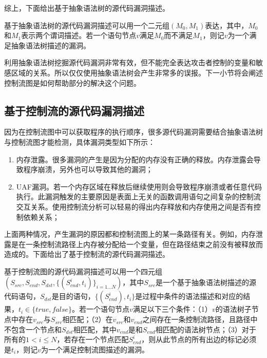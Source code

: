 综上，下面给出基于抽象语法树的源代码漏洞描述。

\begin{definition}
\label{基于抽象语法树的源代码漏洞描述}
基于抽象语法树的源代码漏洞描述可以用一个二元组$(M_0,M_1)$表达，其中，$M_0$和$M_1$表示两个谓词描述。若一个语句节点$v$满足$M_0$而不满足$M_1$，则记$v$为一个满足抽象语法树描述的漏洞。
\end{definition}

利用抽象语法树挖掘源代码漏洞非常有效，但不能完全表达攻击者控制的变量和敏感区域的关系。所以仅仅使用抽象语法树会产生非常多的误报。下一小节将会阐述控制流图是如何帮助部分的解决这个问题。

\subsection{基于控制流的源代码漏洞描述}

因为在控制流图中可以获取程序的执行顺序，很多源代码漏洞需要结合抽象语法树与控制流图才能检测，具体漏洞类型如下所示：

\begin{enumerate}[(1)]
\item 内存泄露。很多漏洞的产生是因为分配的内存没有正确的释放。内存泄露会导致程序崩溃，另外也可以导致其他的漏洞；
\item UAF漏洞。若一个内存区域在释放后继续使用则会导致程序崩溃或者任意代码执行。此漏洞触发的主要原因是表面上无关的函数调用语句之间复杂的控制流交互关系。使用控制流分析可以轻易的得出内存释放和内存使用之间是否有控制依赖关系；
\end{enumerate}
上面两种情况，产生漏洞的原因都和控制流图上的某一条路径有关。例如，内存泄露是在一条控制流路径上内存被分配给一个变量，但在路径结束之前没有被释放而造成的。下面给出了基于控制流的源代码漏洞描述。

\begin{definition}
基于控制流图的源代码漏洞描述可以用一个四元组$(S_{src},S_{end},S_{dst},\{(S^{i}_{cnd},t_i)\}_{i=1...N})$，其中$S_{src}$是一个基于抽象语法树描述的源代码语句，$S_{dst}$是目的语句，$\{(S^{i}_{cnd}),t_i\}$是过程中条件的语法描述和对应的结果，$t_i \in \{true, false\}$。若一个语句节点$v$满足以下三个条件：（1）$v$的语法树子节点中存在$v_{src}$与$S_{src}$相匹配；（2）在$v_{src}$和$v_{end}$之间存在一条控制流路径，且路径中不包含一个节点和$S_{dst}$相匹配，其中$v_{end}$是和$S_{end}$相匹配的语法树节点；（3）对于所有的$1< i \leq N$，若存在一个节点匹配$S^{i}_{end}$，则从此节点的所有出边的标记必须是$t_i$，则记$v$为一个满足控制流图描述的漏洞。
\end{definition}

